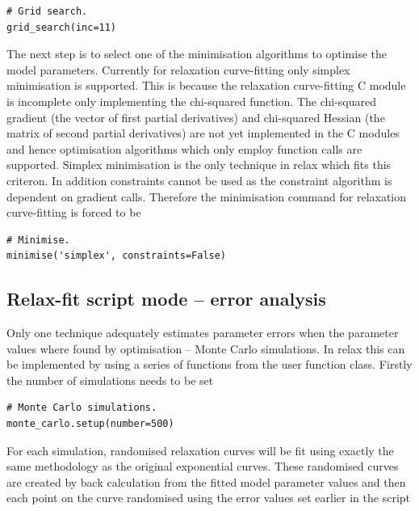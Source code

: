\begin{lstlisting}[firstnumber=62]
# Grid search.
grid_search(inc=11)
\end{lstlisting}

The next step is to select one of the minimisation algorithms to optimise the model parameters.  Currently for relaxation curve-fitting only simplex minimisation is supported.  This is because the relaxation curve-fitting C module is incomplete only implementing the chi-squared function.  The chi-squared gradient (the vector of first partial derivatives) and chi-squared Hessian (the matrix of second partial derivatives) are not yet implemented in the C modules and hence optimisation algorithms which only employ function calls are supported.  Simplex minimisation is the only technique in relax which fits this criteron.  In addition constraints cannot be used as the constraint algorithm is dependent on gradient calls.  Therefore the minimisation command for relaxation curve-fitting is forced to be

\begin{lstlisting}[firstnumber=65]
# Minimise.
minimise('simplex', constraints=False)
\end{lstlisting}




\subsection{Relax-fit script mode -- error analysis}

Only one technique adequately estimates parameter errors when the parameter values where found by optimisation -- Monte Carlo simulations.  In relax this can be implemented by using a series of functions from the  user function class.  Firstly the number of simulations needs to be set

\begin{lstlisting}[firstnumber=68]
# Monte Carlo simulations.
monte_carlo.setup(number=500)
\end{lstlisting}

For each simulation, randomised relaxation curves will be fit using exactly the same methodology as the original exponential curves.  These randomised curves are created by back calculation from the fitted model parameter values and then each point on the curve randomised using the error values set earlier in the script

